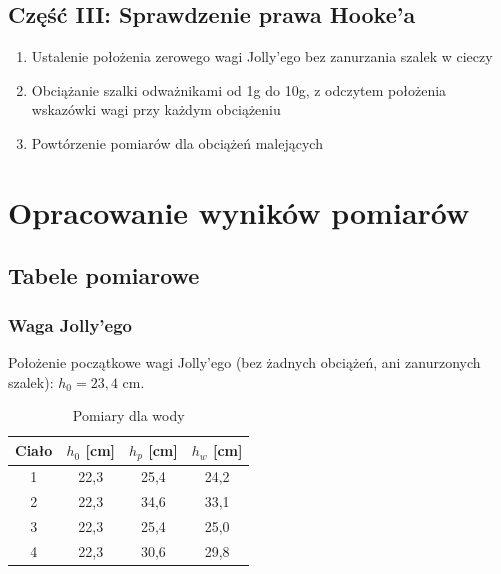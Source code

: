 \documentclass[a4paper,12pt]{article}
\begin{document}
\subsection*{Część III: Sprawdzenie prawa Hooke'a}
\begin{enumerate}
    \setlength{\itemsep}{0em}
    \item Ustalenie położenia zerowego wagi Jolly'ego bez zanurzania szalek w cieczy
    \item Obciążanie szalki odważnikami od 1g do 10g, z odczytem położenia wskazówki wagi przy każdym obciążeniu
    \item Powtórzenie pomiarów dla obciążeń malejących
\end{enumerate}

\section{Opracowanie wyników pomiarów}

\subsection{Tabele pomiarowe}

\subsubsection*{Waga Jolly'ego}

Położenie początkowe wagi Jolly'ego (bez żadnych obciążeń, ani zanurzonych szalek): $h_0 = 23{,}4$ cm.

\begin{table}[h]
    \centering
    \begin{tabular}{|c|c|c|c|}
        \hline
        Ciało & $h_0$ [cm] & $h_p$ [cm] & $h_w$ [cm] \\
        \hline
        1 & 22,3 & 25,4 & 24,2 \\
        \hline
        2 & 22,3 & 34,6 & 33,1 \\
        \hline
        3 & 22,3 & 25,4 & 25,0 \\
        \hline
        4 & 22,3 & 30,6 & 29,8 \\
        \hline
    \end{tabular}
    \caption{Pomiary dla wody}
    \label{tab:waga_jolly_woda}
\end{table}
\end{document}
